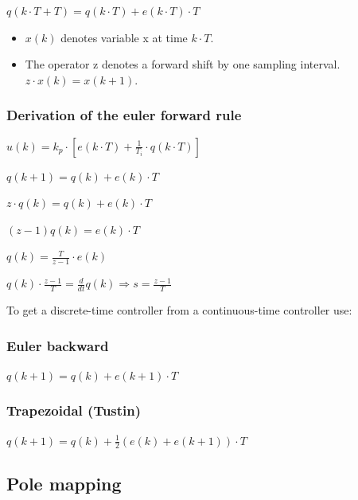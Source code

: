 \documentclass[10pt,a4paper]{scrartcl}
\begin{document}
\begin{multicols*}{3}
	$q(k\cdot T + T)=q(k\cdot T)+e(k\cdot T)\cdot T$
	
	\begin{itemize}
	\compaq
	\item
	$x(k)$ denotes variable x at time $k\cdot T$.
	\item
	The operator z denotes a forward shift by one sampling interval. $z\cdot x(k)=x(k+1)$.
	\end{itemize}
	
	\subsubsection*{Derivation of the euler forward rule}
	
	$u(k)=k_p\cdot\left[e(k\cdot T)+\frac{1}{T_i}\cdot q(k\cdot T)\right]$
	
	$q(k+1)=q(k)+e(k)\cdot T$\hfill{}
	
	$z\cdot q(k)=q(k)+e(k)\cdot T$	
	
	$(z-1)q(k)=e(k)\cdot T$
	
	$q(k)=\frac{T}{z-1}\cdot e(k)$\hfill{}
	
	$q(k)\cdot\frac{z-1}{T}=\frac{d}{dt}q(k)\Longrightarrow s=\frac{z-1}{T}$
	
	\finn
	
	To get a discrete-time controller from a continuous-time controller use:
	
	
	\subsubsection{Euler backward}
	
	$q(k+1)=q(k)+e(k+1)\cdot T$
	
	
	\subsubsection{Trapezoidal (Tustin)}
	
	$q(k+1)=q(k)+\frac{1}{2}\left(e(k)+e(k+1)\right)\cdot T$
	
	
	\subsection*{Pole mapping}
	

\end{multicols*}
\end{document}
